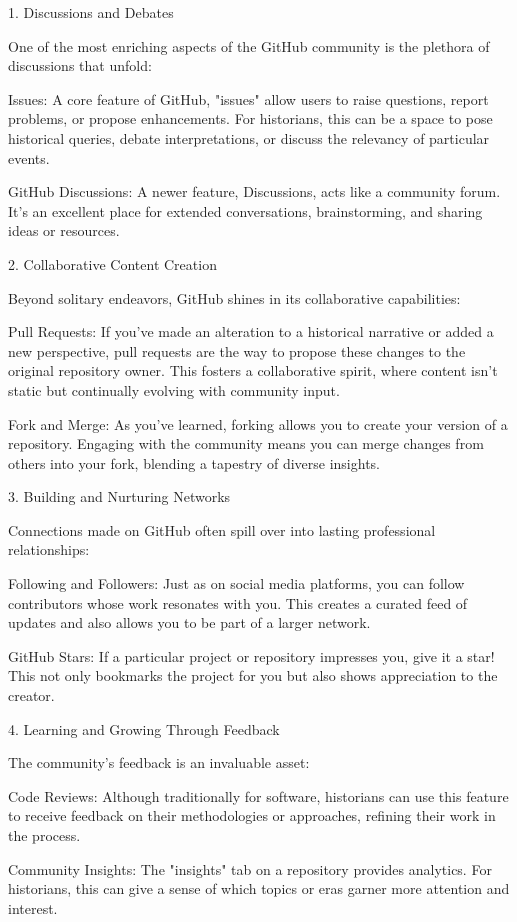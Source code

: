 \documentclass[a4paper,12pt]{book}
\begin{document}
1. Discussions and Debates

One of the most enriching aspects of the GitHub community is the plethora of discussions that unfold:

Issues: A core feature of GitHub, "issues" allow users to raise questions, report problems, or propose enhancements. For historians, this can be a space to pose historical queries, debate interpretations, or discuss the relevancy of particular events.

GitHub Discussions: A newer feature, Discussions, acts like a community forum. It's an excellent place for extended conversations, brainstorming, and sharing ideas or resources.

2. Collaborative Content Creation

Beyond solitary endeavors, GitHub shines in its collaborative capabilities:

Pull Requests: If you've made an alteration to a historical narrative or added a new perspective, pull requests are the way to propose these changes to the original repository owner. This fosters a collaborative spirit, where content isn't static but continually evolving with community input.

Fork and Merge: As you've learned, forking allows you to create your version of a repository. Engaging with the community means you can merge changes from others into your fork, blending a tapestry of diverse insights.

3. Building and Nurturing Networks

Connections made on GitHub often spill over into lasting professional relationships:

Following and Followers: Just as on social media platforms, you can follow contributors whose work resonates with you. This creates a curated feed of updates and also allows you to be part of a larger network.

GitHub Stars: If a particular project or repository impresses you, give it a star! This not only bookmarks the project for you but also shows appreciation to the creator.

4. Learning and Growing Through Feedback

The community's feedback is an invaluable asset:

Code Reviews: Although traditionally for software, historians can use this feature to receive feedback on their methodologies or approaches, refining their work in the process.

Community Insights: The "insights" tab on a repository provides analytics. For historians, this can give a sense of which topics or eras garner more attention and interest.
\end{document}
